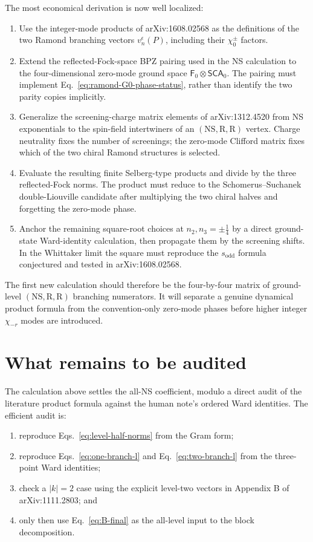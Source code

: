 \documentclass[11pt]{article}
\newcommand{\Ff}{\mathsf F}
\newcommand{\SCA}{\mathsf{SCA}}
\begin{document}
The most economical derivation is now well localized:
\begin{enumerate}
 \item Use the integer-mode products of arXiv:1608.02568 as the definitions of
 the two Ramond branching vectors \(v_n^\epsilon(P)\), including their
 \(\chi_0^\pm\) factors.
 \item Extend the reflected-Fock-space BPZ pairing used in the NS calculation
 to the four-dimensional zero-mode ground space
 \(\Ff_0\otimes\SCA_0\).  The pairing must implement
 Eq.~\eqref{eq:ramond-G0-phase-status}, rather than identify the two parity
 copies implicitly.
 \item Generalize the screening-charge matrix elements of
 arXiv:1312.4520 from NS exponentials to the spin-field intertwiners of an
 \((\mathrm{NS},\mathrm R,\mathrm R)\) vertex.  Charge neutrality fixes the
 number of screenings; the zero-mode Clifford matrix fixes which of the two
 chiral Ramond structures is selected.
 \item Evaluate the resulting finite Selberg-type products and divide by the
 three reflected-Fock norms.  The product must reduce to the
 Schomerus--Suchanek double-Liouville candidate after multiplying the two
 chiral halves and forgetting the zero-mode phase.
 \item Anchor the remaining square-root choices at
 \(n_2,n_3=\pm\frac14\) by a direct ground-state Ward-identity calculation,
 then propagate them by the screening shifts.  In the Whittaker limit the
 square must reproduce the \(s_{\mathrm{odd}}\) formula conjectured and tested
 in arXiv:1608.02568.
\end{enumerate}
The first new calculation should therefore be the four-by-four matrix of
ground-level \((\mathrm{NS},\mathrm R,\mathrm R)\) branching numerators.  It
will separate a genuine dynamical product formula from the convention-only
zero-mode phases before higher integer \(\chi_{-r}\) modes are introduced.

\section{What remains to be audited}

The calculation above settles the all-NS coefficient, modulo a direct audit
of the literature product formula against the human note's ordered Ward
identities.  The efficient audit is:
\begin{enumerate}
 \item reproduce Eqs.~\eqref{eq:level-half-norms} from the Gram form;
 \item reproduce Eqs.~\eqref{eq:one-branch-l} and
 Eq.~\eqref{eq:two-branch-l} from the three-point Ward identities;
 \item check a \(|k|=2\) case using the explicit level-two vectors in
 Appendix B of arXiv:1111.2803; and
 \item only then use Eq.~\eqref{eq:B-final} as the all-level input to the
 block decomposition.
\end{enumerate}
\end{document}
